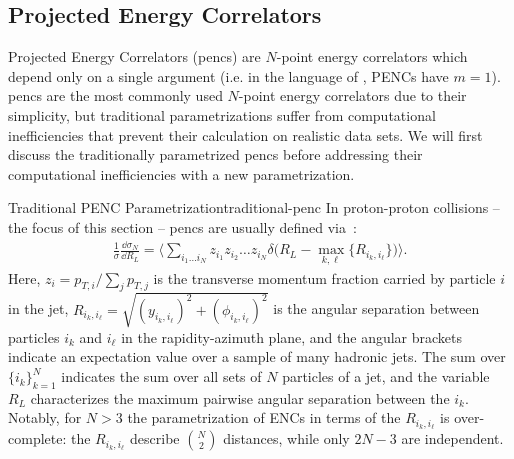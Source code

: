 

\subsection{Projected Energy Correlators}
\label{sec:enc-projected}

Projected Energy Correlators (\glspl{penc}) are $N$-point energy correlators which depend only on a single argument (i.e. in the language of , PENCs have \(m=1\)).
%
\glspl{penc} are the most commonly used $N$-point energy correlators due to their simplicity, but traditional parametrizations suffer from computational inefficiencies that prevent their calculation on realistic data sets.
%
We will first discuss the traditionally parametrized \glspl{penc} before addressing their computational inefficiencies with a new parametrization.

\begin{definitionbox}{Traditional PENC Parametrization}{traditional-penc}
    In proton-proton collisions -- the focus of this section -- \glspl{penc} are usually defined via~\cite{Chen:2020vvp}:
    \begin{align}
        \label{eq:old_def}
        \frac{1}{\sigma}\frac{\dd \sigma_N}{\dd R_L}
       \! =\!
        \biggl\langle
            \sum_{i_1 \dots i_N}
            z_{i_1} z_{i_2} \dots z_{i_N}
            \delta\big(
                R_L
                \!-\!
                \max_{k,\ell}
                \{R_{i_k,i_\ell}\}
            \big)
       \!\! \biggr\rangle.
    \end{align}
    Here, $z_{i}= p_{T,i}/\sum_j p_{T,j}$ is the transverse momentum fraction carried by particle $i$ in the jet, $R_{i_k,i_\ell} = \sqrt{(y_{i_k,i_\ell})^2 + (\phi_{i_k,i_\ell})^2}$
    is the angular separation between particles $i_k$ and $i_\ell$ in the rapidity-azimuth plane, and the angular brackets indicate an expectation value over a sample of many hadronic jets.
    The sum over $\{i_k\}_{k=1}^N$ indicates the sum over all sets of $N$ particles of a jet, and the variable \(R_L\) characterizes the maximum pairwise angular separation between the \(i_k\).
    Notably, for $N>3$ the parametrization of ENCs in terms of the $R_{i_k,i_\ell}$ is over-complete:
    the $R_{i_k,i_\ell}$ describe $N \choose 2$ distances, while only $2N-3$ are independent.
\end{definitionbox}

